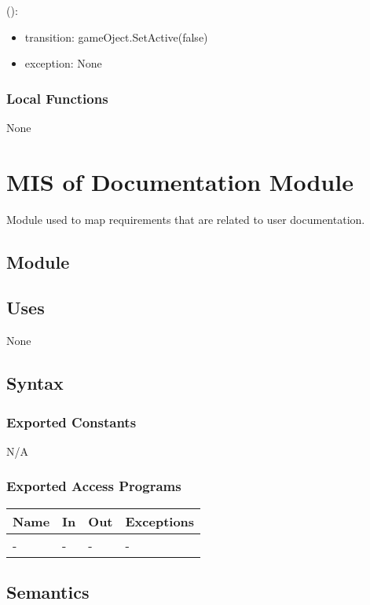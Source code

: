 \documentclass[12pt, titlepage]{article}
\begin{document}
():
\begin{itemize}
\item transition: gameOject.SetActive(false)
\item exception: None
\end{itemize}


\subsubsection{Local Functions}
None

\newpage 

\section{MIS of {Documentation Module}} \label{DocModule} 
Module used to map requirements that are related to user documentation. 
\subsection{Module}

\subsection{Uses}
 None

\subsection{Syntax}

\subsubsection{Exported Constants}
N/A
\subsubsection{Exported Access Programs}

\begin{center}
\begin{tabular}{p{2cm} p{4cm} p{4cm} p{2cm}}
\hline
\textbf{Name} & \textbf{In} & \textbf{Out} & \textbf{Exceptions} \\
\hline
- & - & - & - \\
\hline
\end{tabular}
\end{center}

\subsection{Semantics}
\end{document}
